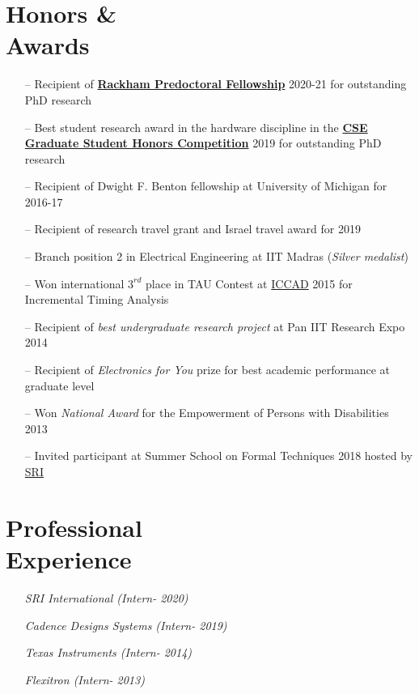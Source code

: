 \documentclass[line,margin,letter]{resume}
\begin{document}
\begin{resume}
\section{\mysidestyle Honors \& \\ Awards}
    \noindent
    \begin{itemize}[leftmargin=*]
    \item[--] Recipient of \href{https://news.engin.umich.edu/2020/03/predoctoral-fellowship-for-mathematically-provable-hardware-design/}{\textbf{Rackham Predoctoral Fellowship}} 2020-21 for outstanding PhD research
    \item[--] Best student research award in the hardware discipline in the \href{https://cse.engin.umich.edu/stories/2019-cse-graduate-student-honors-competition-highlights-outstanding-research}{\textbf{CSE Graduate Student Honors Competition}} 2019 for outstanding PhD research
    \item[--] Recipient of Dwight F. Benton fellowship at University of Michigan for 2016-17
    \item[--] Recipient of research travel grant and Israel travel award for 2019
    \item[--] Branch position 2 in Electrical Engineering at IIT Madras (\textit{Silver medalist})
    \item[--] Won international $3^{rd}$ place in TAU Contest at \href{https://iccad.com/}{ICCAD} 2015 for Incremental Timing Analysis
    \item[--] Recipient of \textit{best undergraduate research project} at Pan IIT Research Expo 2014
    \item[--] Recipient of \textit{Electronics for You} prize for best academic performance at graduate level
    \item[--] Won \textit{National Award} for the Empowerment of Persons with Disabilities 2013
    \item[--] Invited participant at Summer School on Formal Techniques 2018 hosted by \href{http://csl.sri.com/}{SRI}
    \end{itemize}

\section{\mysidestyle Professional \\ Experience}
    \vspace{-0.02cm}
        \begin{multicols}{2}
        \begin{itemize}
        \item[] \emph{SRI International (Intern- 2020)}
        \item[] \emph{Cadence Designs Systems  (Intern- 2019)}
        \item[] \emph{Texas Instruments (Intern- 2014)}
        \item[] \emph{Flexitron (Intern- 2013)}
        \end{itemize}
        \end{multicols}


\end{resume}
\end{document}
